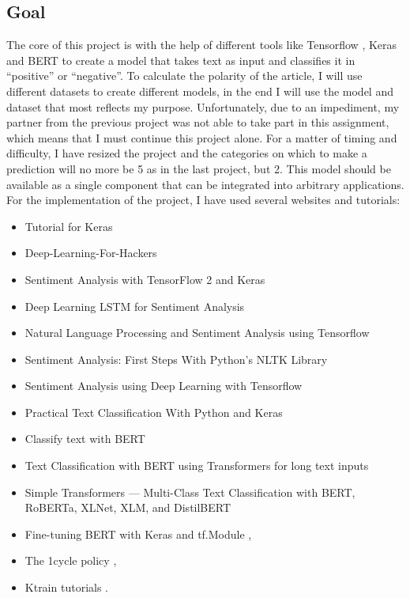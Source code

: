 \subsection[Goal]{Goal}
\label{chap:intro_goal}
The core of this project is with the help of different tools like \gls{Tensorflow} \cite{tensorflow}, \gls{Keras} \cite{noauthor_keras_nodate} and \gls{BERT} \cite{devlin_bert_2019} to create a model that takes text as input and classifies it in “positive” or “negative”. 
To calculate the polarity of the article, I will use different datasets to create different models, in the end I will use the model and dataset that most reflects my purpose.
Unfortunately, due to an impediment, my partner from the previous project was not able to take part in this assignment, which means that I must continue this project alone.
For a matter of timing and difficulty, I have resized the project and the categories on which to make a prediction will no more be 5 as in the last project, but 2.
This model should be available as a single component that can be integrated into arbitrary applications.\\
For the implementation of the project, I have used several websites and tutorials:
\begin{itemize}
    \item Tutorial for \gls{Keras} \cite{tutorial_keras}
    \item Deep-Learning-For-Hackers \cite{git}
    \item Sentiment Analysis with TensorFlow 2 and \gls{Keras} \cite{tutorial}
    \item Deep Learning LSTM for Sentiment Analysis \cite{karikari_deep_2020}
    \item Natural Language Processing and Sentiment Analysis using \gls{Tensorflow} \cite{khan_natural_2020}
    \item Sentiment Analysis: First Steps With Python's NLTK Library \cite{python_sentiment_nodate}
    \item Sentiment Analysis using Deep Learning with \gls{Tensorflow} \cite{pandey_sentiment_2020}
    \item Practical Text Classification With Python and \gls{Keras} \cite{python_practical_nodate}
    \item Classify text with \gls{BERT} \cite{noauthor_classify_nodate}
    \item Text Classification with \gls{BERT} using Transformers for long text inputs \cite{girdhar_text_2020}
    \item Simple Transformers — Multi-Class Text Classification with \gls{BERT}, RoBERTa, XLNet, XLM, and DistilBERT \cite{rajapakse_simple_2019}
    \item Fine-tuning \gls{BERT} with \gls{Keras} and tf.Module \cite{antyukhov_fine-tuning_2020},
    \item The 1cycle policy \cite{gugger_1cycle_nodate},
    \item \gls{Ktrain} tutorials \cite{maiya_amaiyaktrain_2021}.
\end{itemize}


